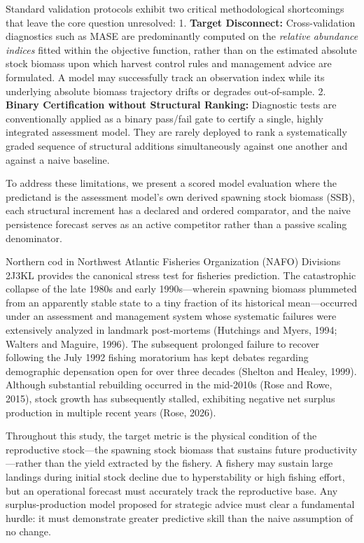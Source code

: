 \documentclass[11pt]{article}
\begin{document}
Standard validation protocols exhibit two critical methodological
shortcomings that leave the core question unresolved: 1. \textbf{Target
Disconnect:} Cross-validation diagnostics such as MASE are predominantly
computed on the \emph{relative abundance indices} fitted within the
objective function, rather than on the estimated absolute stock biomass
upon which harvest control rules and management advice are formulated. A
model may successfully track an observation index while its underlying
absolute biomass trajectory drifts or degrades out-of-sample. 2.
\textbf{Binary Certification without Structural Ranking:} Diagnostic
tests are conventionally applied as a binary pass/fail gate to certify a
single, highly integrated assessment model. They are rarely deployed to
rank a systematically graded sequence of structural additions
simultaneously against one another and against a naive baseline.

To address these limitations, we present a scored model evaluation where
the predictand is the assessment model's own derived spawning stock
biomass (SSB), each structural increment has a declared and ordered
comparator, and the naive persistence forecast serves as an active
competitor rather than a passive scaling denominator.

Northern cod in Northwest Atlantic Fisheries Organization (NAFO)
Divisions 2J3KL provides the canonical stress test for fisheries
prediction. The catastrophic collapse of the late 1980s and early
1990s---wherein spawning biomass plummeted from an apparently stable
state to a tiny fraction of its historical mean---occurred under an
assessment and management system whose systematic failures were
extensively analyzed in landmark post-mortems (Hutchings and Myers,
1994; Walters and Maguire, 1996). The subsequent prolonged failure to
recover following the July 1992 fishing moratorium has kept debates
regarding demographic depensation open for over three decades (Shelton
and Healey, 1999). Although substantial rebuilding occurred in the
mid-2010s (Rose and Rowe, 2015), stock growth has subsequently stalled,
exhibiting negative net surplus production in multiple recent years
(Rose, 2026).

Throughout this study, the target metric is the physical condition of
the reproductive stock---the spawning stock biomass that sustains future
productivity---rather than the yield extracted by the fishery. A fishery
may sustain large landings during initial stock decline due to
hyperstability or high fishing effort, but an operational forecast must
accurately track the reproductive base. Any surplus-production model
proposed for strategic advice must clear a fundamental hurdle: it must
demonstrate greater predictive skill than the naive assumption of no
change.
\end{document}
